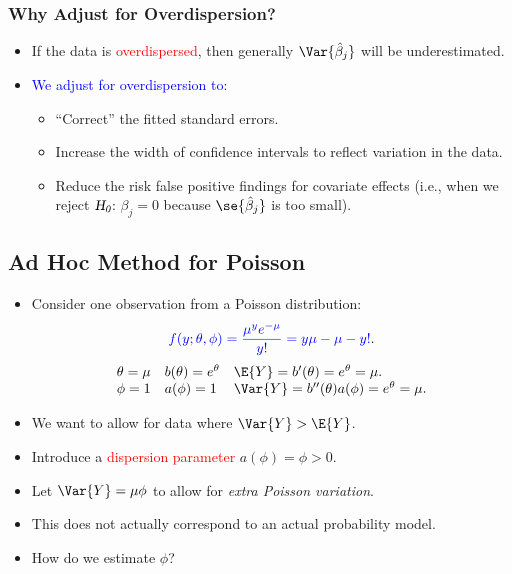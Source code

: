 \documentclass[oneside]{book}\usepackage[]{graphicx}\usepackage[svgnames]{xcolor}
\let\exp\relax%
\let\log\relax%
\newcommand{\HN}{\textsl{H}_{\textsl{0}}}%
\begin{document}
\subsubsection*{Why Adjust for Overdispersion?}
\begin{itemize}
    \item If the data is \textcolor{Red}{overdispersed}, then generally $ \Var{\hat{\beta}_j} $ will be underestimated.
    \item \textcolor{Blue}{We adjust for overdispersion to}:
          \begin{itemize}
              \item ``Correct'' the fitted standard errors.
              \item Increase the width of confidence intervals to reflect variation in the data.
              \item Reduce the risk false positive findings for covariate effects (i.e., when we reject $ \HN $: $ \beta_j=0 $
                    because $ \se{\hat{\beta}_j} $ is too small).
          \end{itemize}
\end{itemize}
\subsection*{Ad Hoc Method for Poisson}
\begin{itemize}
    \item Consider one observation from a Poisson distribution:
          \[ \textcolor{Blue}{f(y;\theta,\phi)=\frac{\mu^y e^{-\mu}}{y!}=\exp{y\log{\mu}-\mu-\log{y!}}}. \]
          \[ \begin{array}{lll}
                  \theta=\log{\mu} & b(\theta)=e^{\theta} & \E{Y}=b^\prime(\theta)=e^{\theta}=\mu.                  \\
                  \phi=1           & a(\phi)=1            & \Var{Y}=b^{\prime\prime}(\theta)a(\phi)=e^{\theta}=\mu.
              \end{array} \]
    \item We want to allow for data where $ \Var{Y}>\E{Y} $.
    \item Introduce a \textcolor{Red}{dispersion parameter} $ a(\phi)=\phi>0 $.
    \item Let $ \Var{Y}=\mu\phi $ to allow for \emph{extra Poisson variation}.
    \item This does not actually correspond to an actual probability model.
    \item How do we estimate $ \phi $?
\end{itemize}
\end{document}
